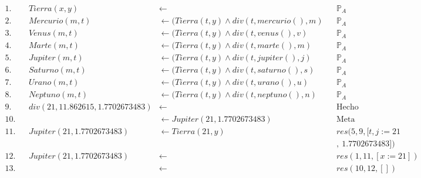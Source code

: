 \documentclass[8pt, letterpaper]{article}
\begin{document}
\begin{enumerate}
\begin{enumerate}
      \begin{align*}
        1. & & Tierra (x, y)&\leftarrow & &\mathbb{P}_A\\
        2.& & Mercurio(m, t)&\leftarrow(Tierra (t, y) \land div(t, mercurio(), m) & &\mathbb{P}_A\\
        3.& & Venus(m, t)&\leftarrow(Tierra (t, y) \land div(t, venus(), v) & &\mathbb{P}_A\\
        4.& & Marte(m, t)&\leftarrow(Tierra (t, y) \land div(t, marte(), m) & &\mathbb{P}_A\\
        5.& &Jupiter(m, t)&\leftarrow(Tierra (t, y) \land div(t, jupiter(), j) & &\mathbb{P}_A\\
        6.& & Saturno(m, t)&\leftarrow(Tierra (t, y) \land div(t, saturno(), s)
        & &\mathbb{P}_A\\
        7.& & Urano(m, t)&\leftarrow(Tierra (t, y) \land div(t, urano(), u)
         & &\mathbb{P}_A\\
        8.& & Neptuno(m, t)&\leftarrow(Tierra (t, y) \land div(t, neptuno(), n)
        & &\mathbb{P}_A\\
        9.& &div(21, 11.862615, 1.7702673483)&\leftarrow & &\text{Hecho}\\
        10.& &&\leftarrow  Jupiter(21, 1.7702673483)& &\text{Meta}\\
        11.& &Jupiter(21, 1.7702673483)&\leftarrow Tierra (21, y)
        & &res(5, 9, [t, j:= 21\\
          & & & & & ,\ 1.7702673483])\\
        12.& &Jupiter(21, 1.7702673483)&\leftarrow &
        &res(1, 11, [x:=21])\\
        13.& &&\leftarrow &
        &res(10, 12, [])
      \end{align*}
    \end{enumerate}
\end{enumerate}
\end{document}
